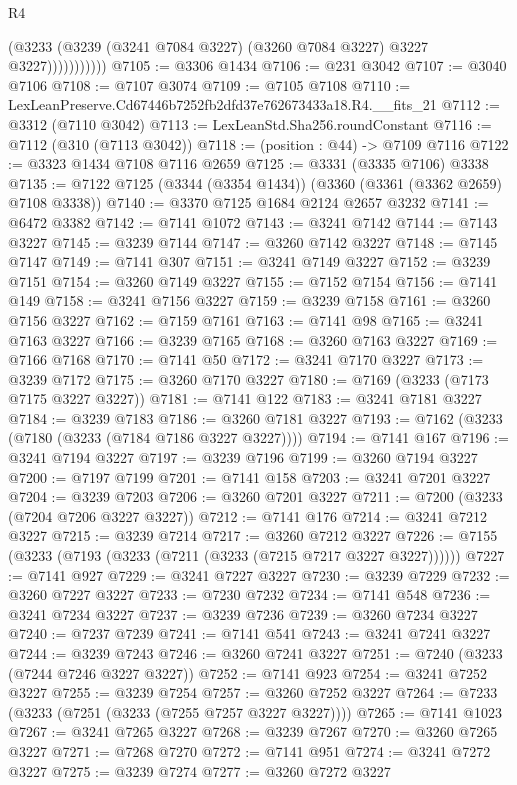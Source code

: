 \begin{lexlean}{R4}
\begin{coremodule}
                      (@3233 (@3239 (@3241 @7084 @3227) (@3260 @7084 @3227) @3227 @3227)))))))))))
@7105 := @3306 @1434
@7106 := @231 @3042
@7107 := @3040 @7106
@7108 := @7107 @3074
@7109 := @7105 @7108
@7110 := LexLeanPreserve.Cd67446b7252fb2dfd37e762673433a18.R4.__fits_21
@7112 := @3312 (@7110 @3042)
@7113 := LexLeanStd.Sha256.roundConstant
@7116 := @7112 (@310 (@7113 @3042))
@7118 := (position : @44) -> @7109 @7116
@7122 := @3323 @1434 @7108 @7116 @2659
@7125 := @3331 (@3335 @7106) @3338
@7135 := @7122 @7125 (@3344 (@3354 @1434)) (@3360 (@3361 (@3362 @2659) @7108 @3338))
@7140 := @3370 @7125 @1684 @2124 @2657 @3232
@7141 := @6472 @3382
@7142 := @7141 @1072
@7143 := @3241 @7142
@7144 := @7143 @3227
@7145 := @3239 @7144
@7147 := @3260 @7142 @3227
@7148 := @7145 @7147
@7149 := @7141 @307
@7151 := @3241 @7149 @3227
@7152 := @3239 @7151
@7154 := @3260 @7149 @3227
@7155 := @7152 @7154
@7156 := @7141 @149
@7158 := @3241 @7156 @3227
@7159 := @3239 @7158
@7161 := @3260 @7156 @3227
@7162 := @7159 @7161
@7163 := @7141 @98
@7165 := @3241 @7163 @3227
@7166 := @3239 @7165
@7168 := @3260 @7163 @3227
@7169 := @7166 @7168
@7170 := @7141 @50
@7172 := @3241 @7170 @3227
@7173 := @3239 @7172
@7175 := @3260 @7170 @3227
@7180 := @7169 (@3233 (@7173 @7175 @3227 @3227))
@7181 := @7141 @122
@7183 := @3241 @7181 @3227
@7184 := @3239 @7183
@7186 := @3260 @7181 @3227
@7193 := @7162 (@3233 (@7180 (@3233 (@7184 @7186 @3227 @3227))))
@7194 := @7141 @167
@7196 := @3241 @7194 @3227
@7197 := @3239 @7196
@7199 := @3260 @7194 @3227
@7200 := @7197 @7199
@7201 := @7141 @158
@7203 := @3241 @7201 @3227
@7204 := @3239 @7203
@7206 := @3260 @7201 @3227
@7211 := @7200 (@3233 (@7204 @7206 @3227 @3227))
@7212 := @7141 @176
@7214 := @3241 @7212 @3227
@7215 := @3239 @7214
@7217 := @3260 @7212 @3227
@7226 := @7155 (@3233 (@7193 (@3233 (@7211 (@3233 (@7215 @7217 @3227 @3227))))))
@7227 := @7141 @927
@7229 := @3241 @7227 @3227
@7230 := @3239 @7229
@7232 := @3260 @7227 @3227
@7233 := @7230 @7232
@7234 := @7141 @548
@7236 := @3241 @7234 @3227
@7237 := @3239 @7236
@7239 := @3260 @7234 @3227
@7240 := @7237 @7239
@7241 := @7141 @541
@7243 := @3241 @7241 @3227
@7244 := @3239 @7243
@7246 := @3260 @7241 @3227
@7251 := @7240 (@3233 (@7244 @7246 @3227 @3227))
@7252 := @7141 @923
@7254 := @3241 @7252 @3227
@7255 := @3239 @7254
@7257 := @3260 @7252 @3227
@7264 := @7233 (@3233 (@7251 (@3233 (@7255 @7257 @3227 @3227))))
@7265 := @7141 @1023
@7267 := @3241 @7265 @3227
@7268 := @3239 @7267
@7270 := @3260 @7265 @3227
@7271 := @7268 @7270
@7272 := @7141 @951
@7274 := @3241 @7272 @3227
@7275 := @3239 @7274
@7277 := @3260 @7272 @3227

\end{coremodule}
\end{lexlean}
